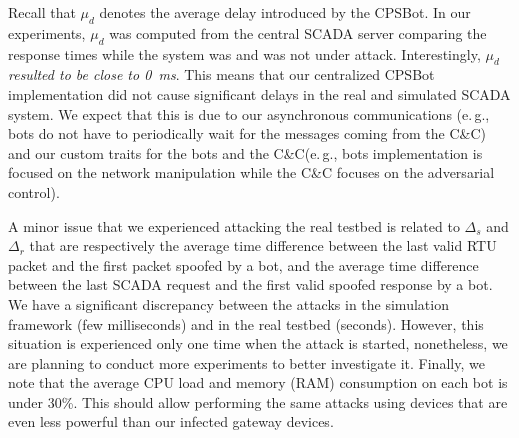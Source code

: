\documentclass[sigconf]{acmart}
\makeatletter
\newcommand{\eg}{e.\@\,g.,\@\xspace}
\newcommand{\Botnet}{CPSBot\@\xspace}
\newcommand{\CC}{C\&C\@\xspace}
\makeatother
\begin{document}
Recall that $\mu_d$ denotes the average delay introduced by the \Botnet.
In our experiments, $\mu_d$ was computed from the central SCADA server
comparing the response times while the system was and was not under attack.
Interestingly, $\mu_d$ \emph{resulted to be close to 0~ms}. This means that our centralized
\Botnet implementation did not cause significant delays in the real and
simulated SCADA system. We expect that this is due to our asynchronous communications
(\eg bots do not have to periodically wait for the messages coming from the
\CC) and our custom traits for the bots and the \CC (\eg bots implementation
is focused on the network manipulation while the \CC focuses on the
adversarial control).

A minor issue that we experienced attacking the real testbed is related
to $\Delta_{s}$ and $\Delta_{r}$ that are respectively the average time
difference between the last valid RTU packet and the first packet spoofed by
a bot, and the average time difference between the last SCADA request and
the first valid spoofed response by a bot. We have a significant discrepancy
between the attacks in the simulation framework (few milliseconds) and in the
real testbed (seconds). However, this situation is experienced only one time
when the attack is started, nonetheless, we are planning to conduct more
experiments to better investigate it. Finally, we note that the average CPU
load and memory (RAM) consumption on each bot is under 30\%. This should
allow performing the same attacks using devices that are even less powerful
than our infected gateway devices.
\end{document}
